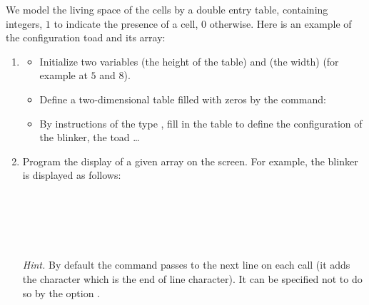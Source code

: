 \documentclass[11pt,class=report,crop=false]{standalone}
\begin{document}
\begin{activite}[Display]

We model the living space of the cells by a double entry table, containing integers, $1$ to indicate the presence of a cell, $0$ otherwise. Here is an example of the configuration \og{}toad\fg{} and its array:


\begin{enumerate}
  \item 
  \begin{itemize}
    \item Initialize two variables  (the height of the table) and  (the width) (for example at $5$ and $8$).
    
    \item Define a two-dimensional table filled with zeros by the command:  
    
    \item By instructions of the type , fill in the table to define the configuration of the blinker, the toad \ldots
  \end{itemize}
  
  \item Program the display of a given array on the screen. 
  For example, the blinker is displayed as follows:
  
\begin{center}
\\
\\
\\
\\
\end{center}

  \emph{Hint.} By default the command  passes to the next line on each call (it adds the character  which is the end of line character). It can be specified not to do so by the option
  .
  
\end{enumerate}
\end{activite}



\end{document}
